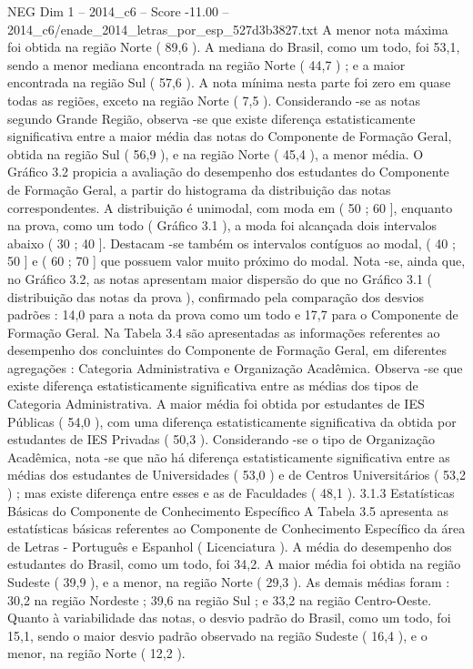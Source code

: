 \begin{textsample}{NEG Dim 1 – 2014\_c6 – Score -11.00 – 2014\_c6/enade\_2014\_letras\_por\_esp\_527d3b3827.txt}
A menor nota máxima foi obtida na região Norte ( 89,6 ).
A mediana do Brasil, como um todo, foi 53,1, sendo a menor mediana encontrada na região Norte ( 44,7 ) ; e a maior encontrada na região Sul ( 57,6 ).
A nota mínima nesta parte foi zero em quase todas as regiões, exceto na região Norte ( 7,5 ).
Considerando -se as notas segundo Grande Região, observa -se que existe diferença estatisticamente significativa entre a maior média das notas do Componente de Formação Geral, obtida na região Sul ( 56,9 ), e na região Norte ( 45,4 ), a menor média.
O Gráfico 3.2 propicia a avaliação do desempenho dos estudantes do Componente de Formação Geral, a partir do histograma da distribuição das notas correspondentes.
A distribuição é unimodal, com moda em ( 50 ; 60 ], enquanto na prova, como um todo ( Gráfico 3.1 ), a moda foi alcançada dois intervalos abaixo ( 30 ; 40 ].
Destacam -se também os intervalos contíguos ao modal, ( 40 ; 50 ] e ( 60 ; 70 ] que possuem valor muito próximo do modal.
Nota -se, ainda que, no Gráfico 3.2, as notas apresentam maior dispersão do que no Gráfico 3.1 ( distribuição das notas da prova ), confirmado pela comparação dos desvios padrões : 14,0 para a nota da prova como um todo e 17,7 para o Componente de Formação Geral.
Na Tabela 3.4 são apresentadas as informações referentes ao desempenho dos concluintes do Componente de Formação Geral, em diferentes agregações : Categoria Administrativa e Organização Acadêmica.
Observa -se que existe diferença estatisticamente significativa entre as médias dos tipos de Categoria Administrativa.
A maior média foi obtida por estudantes de IES Públicas ( 54,0 ), com uma diferença estatisticamente significativa da obtida por estudantes de IES Privadas ( 50,3 ).
Considerando -se o tipo de Organização Acadêmica, nota -se que não há diferença estatisticamente significativa entre as médias dos estudantes de Universidades ( 53,0 ) e de Centros Universitários ( 53,2 ) ; mas existe diferença entre esses e as de Faculdades ( 48,1 ). 3.1.3 Estatísticas Básicas do Componente de Conhecimento Específico A Tabela 3.5 apresenta as estatísticas básicas referentes ao Componente de Conhecimento Específico da área de Letras - Português e Espanhol ( Licenciatura ).
A média do desempenho dos estudantes do Brasil, como um todo, foi 34,2.
A maior média foi obtida na região Sudeste ( 39,9 ), e a menor, na região Norte ( 29,3 ).
As demais médias foram : 30,2 na região Nordeste ; 39,6 na região Sul ; e 33,2 na região Centro-Oeste.
Quanto à variabilidade das notas, o desvio padrão do Brasil, como um todo, foi 15,1, sendo o maior desvio padrão observado na região Sudeste ( 16,4 ), e o menor, na região Norte ( 12,2 ).

\end{textsample}
